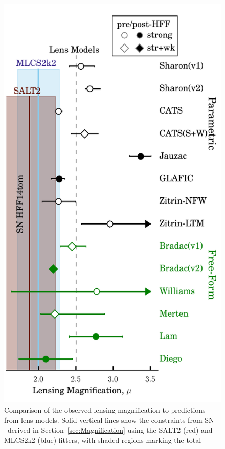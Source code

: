 \begin{figure}
\begin{center}
\includegraphics[width=\columnwidth]{FIG/snTomas_magnifications}
\caption{ 
Comparison of the observed lensing magnification to predictions from
lens models. Solid vertical lines show the constraints from SN \tomas\
derived in Section~\ref{sec:Magnification} using the SALT2 (red) and
MLCS2k2 (blue) fitters, with shaded regions marking the total
}
\end{center}
\end{figure}
